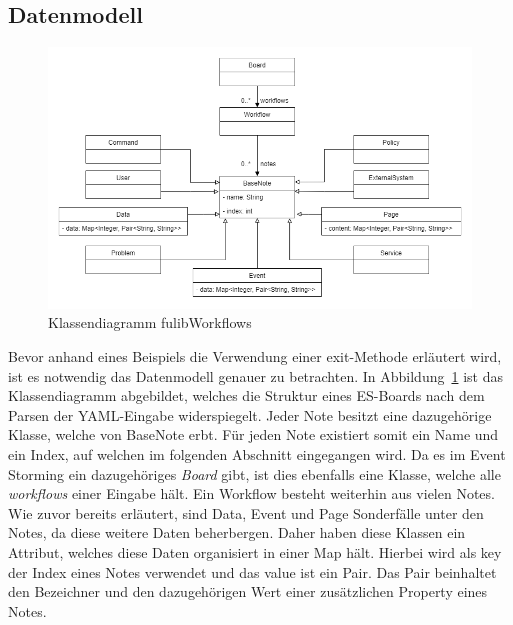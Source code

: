 \subsection{Datenmodell}\label{subsec:datenmodell}


\begin{figure}[h]
    \centering
    \includegraphics[width=1\textwidth]{images/3.1/classdiagram.drawio}
    \caption{Klassendiagramm fulibWorkflows}
    \label{fig:classdiagram}
\end{figure}


Bevor anhand eines Beispiels die Verwendung einer exit-Methode erläutert wird, ist es notwendig das Datenmodell genauer zu betrachten.
In Abbildung~\ref{fig:classdiagram} ist das Klassendiagramm abgebildet, welches die Struktur eines \ac{ES}-Boards nach dem Parsen der YAML-Eingabe widerspiegelt.
Jeder Note besitzt eine dazugehörige Klasse, welche von BaseNote erbt.
Für jeden Note existiert somit ein Name und ein Index, auf welchen im folgenden Abschnitt eingegangen wird.
Da es im Event Storming ein dazugehöriges \textit{Board} gibt, ist dies ebenfalls eine Klasse, welche alle \textit{workflows} einer Eingabe hält.
Ein Workflow besteht weiterhin aus vielen Notes.
Wie zuvor bereits erläutert, sind Data, Event und Page Sonderfälle unter den Notes, da diese weitere Daten beherbergen.
Daher haben diese Klassen ein Attribut, welches diese Daten organisiert in einer Map hält.
Hierbei wird als key der Index eines Notes verwendet und das value ist ein Pair.
Das Pair beinhaltet den Bezeichner und den dazugehörigen Wert einer zusätzlichen Property eines Notes.
